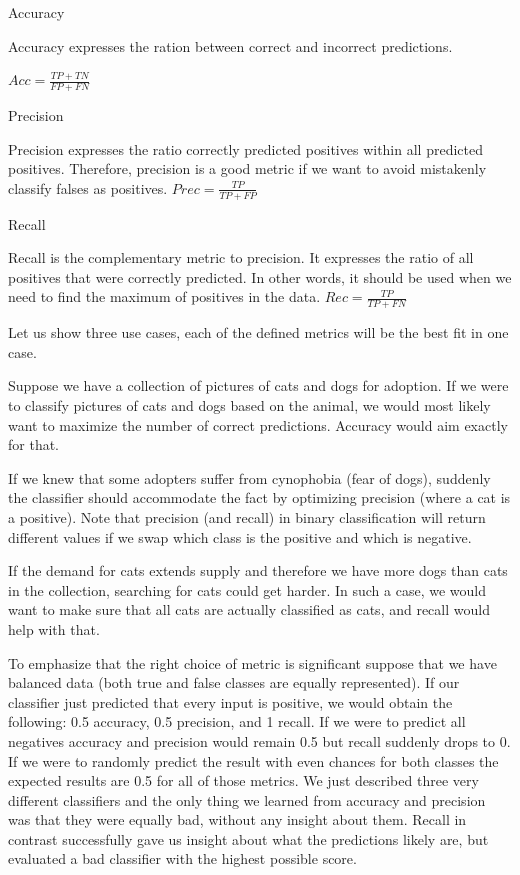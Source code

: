 Accuracy

Accuracy expresses the ration between correct and incorrect predictions.

$Acc = \frac{TP+TN}{FP+FN}$

Precision

Precision expresses the ratio correctly predicted positives within all predicted positives. Therefore, precision is a good metric if we want to avoid mistakenly classify falses as positives.
$Prec = \frac{TP}{TP + FP}$


Recall

Recall is the complementary metric to precision. It expresses the ratio of all positives that were correctly predicted. In other words, it should be used when we need to find the maximum of positives in the data.
$Rec = \frac{TP}{TP + FN}$

Let us show three use cases, each of the defined metrics will be the best fit in one case.

Suppose we have a collection of pictures of cats and dogs for adoption. If we were to classify pictures of cats and dogs based on the animal, we would most likely want to maximize the number of correct predictions. Accuracy would aim exactly for that.

If we knew that some adopters suffer from cynophobia (fear of dogs), suddenly the classifier should accommodate the fact by optimizing precision (where a cat is a positive). Note that precision (and recall) in binary classification will return different values if we swap which class is the positive and which is negative.

If the demand for cats extends supply and therefore we have more dogs than cats in the collection, searching for cats could get harder. In such a case, we would want to make sure that all cats are actually classified as cats, and recall would help with that.


To emphasize that the right choice of metric is significant suppose that we have balanced data (both true and false classes are equally represented). If our classifier just predicted that every input is positive, we would obtain the following: 0.5 accuracy, 0.5 precision, and 1 recall. If we were to predict all negatives accuracy and precision would remain 0.5 but recall suddenly drops to 0. If we were to randomly predict the result with even chances for both classes the expected results are 0.5 for all of those metrics. We just described three very different classifiers and the only thing we learned from accuracy and precision was that they were equally bad, without any insight about them. Recall in contrast successfully gave us insight about what the predictions likely are, but evaluated a bad classifier with the highest possible score.   

